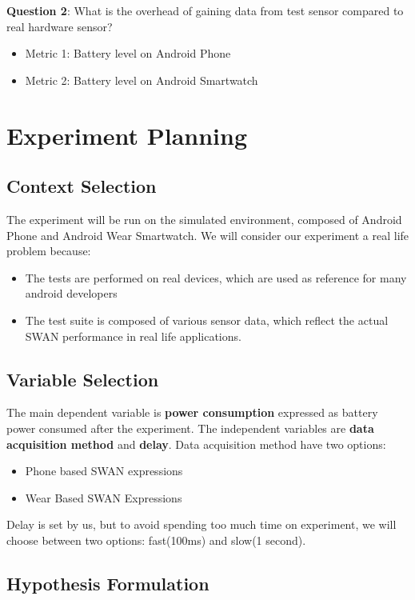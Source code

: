 \textbf{Question 2}:  What is the overhead of gaining data from test sensor compared to real hardware sensor?
\begin{itemize}
 \item Metric 1:  Battery level on Android Phone
 \item Metric 2: Battery level on Android Smartwatch
\end{itemize}

\section{Experiment Planning}
\subsection{Context Selection}
The experiment will be run on the simulated environment, composed of Android Phone and Android Wear Smartwatch. We will consider our experiment a real life problem because:
\begin{itemize}
 \item The tests are performed on real devices, which are used as reference for many android developers
 \item The test suite is composed of various sensor data, which reflect the actual SWAN performance in real life applications.
\end{itemize}

\subsection{Variable Selection}

The main dependent variable is \textbf{power consumption} expressed as battery power consumed after the experiment.
The independent variables are \textbf{data acquisition method} and \textbf{delay}.
Data acquisition method  have two options:
\begin{itemize}
 \item Phone based SWAN expressions
 \item Wear Based SWAN Expressions
\end{itemize}

Delay is set by us, but to avoid spending too much time on experiment, we will choose between two options: fast(100ms) and slow(1 second).

\subsection{ Hypothesis Formulation}

